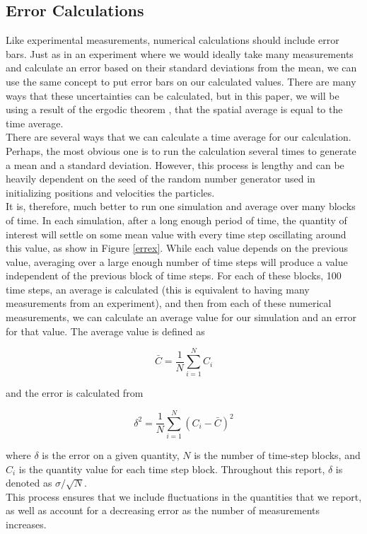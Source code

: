 \documentclass{article}
\begin{document}
\begin{multicols}{2}
\appendix 

\section{Error Calculations}
\label{errorcalc}

Like experimental measurements, numerical calculations should include error bars.  Just as in an experiment where we would ideally take many measurements and calculate an error based on their standard deviations from the mean, we can use the same concept to put error bars on our calculated values.  There are many ways that these uncertainties can be calculated, but in this paper, we will be using a result of the ergodic theorem \cite{Birkhoff}, that the spatial average is equal to the time average.  \\

There are several ways that we can calculate a time average for our calculation.  Perhaps, the most obvious one is to run the calculation several times to generate a mean and a standard deviation.  However, this process is lengthy and can be heavily dependent on the seed of the random number generator used in initializing positions and velocities the particles.  \\



It is, therefore, much better to run one simulation and average over many blocks of time.  In each simulation, after a long enough period of time, the quantity of interest will settle on some mean value with every time step oscillating around this value, as show in Figure \ref{errex}.  While each value depends on the previous value, averaging over a large enough number of time steps will produce a value independent of the previous block of time steps.  For each of these blocks, 100 time steps, an average is calculated (this is equivalent to having many measurements from an experiment), and then from each of these numerical measurements, we can calculate an average value for our simulation and an error for that value.  The average value is defined as 

\begin{equation}
\bar{C} = \frac{1}{N}\sum \limits _{i=1}^N C_i 
\end{equation}

\noindent and the error is calculated from 

\begin{equation}
\delta ^2 = \frac{1}{N}\sum \limits _{i=1}^N (C_i - \bar{C})^2
\end{equation}

\noindent where $\delta$ is the error on a given quantity, $N$ is the number of time-step blocks, and $C_i$ is the quantity value for each time step block.  Throughout this report, $\delta$ is denoted as $\sigma /\sqrt{N}$.  \\

This process ensures that we include fluctuations in the quantities that we report, as well as account for a decreasing error as the number of measurements increases.  \\

\end{multicols}
\end{document}
